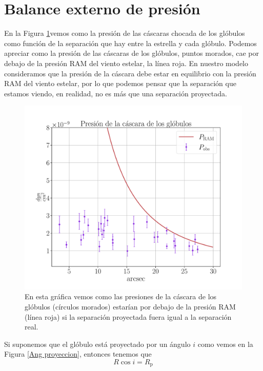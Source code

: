 \documentclass{book}
\begin{document}
\section{Balance externo de presión}\label{Sec:proyeccion}

En la Figura \ref{graf_presion}vemos como la presión de las cáscaras
chocada de los glóbulos como función de la separación que hay entre la
estrella y cada glóbulo. Podemos apreciar como la presión de las
cáscaras de los glóbulos, puntos morados, cae por debajo de la presión
RAM del viento estelar, la línea roja. En nuestro modelo consideramos
que la presión de la cáscara debe estar en equilibrio con la presión
RAM del viento estelar, por lo que podemos pensar que la separación
que estamos viendo, en realidad, no es más que una separación
proyectada.

\begin{figure}[htb]
    \centering
    \includegraphics[width=\textwidth]{imagenes_corregidas/S_R.pdf}
    \caption{En esta gráfica vemos como las presiones de la cáscara de
      los glóbulos (círculos morados) estarían por debajo de la
      presión RAM (línea roja) si la separación proyectada fuera igual
      a la separación real.}
    \label{graf_presion}
\end{figure}

Si suponemos que el glóbulo está proyectado por un ángulo $i$ como
vemos en la Figura \ref{Ang proyeccion}, entonces tenemos que
\begin{equation}
R\cos i=R_\mathrm{p}
\end{equation}\label{eq:sep_real} 
\end{document}
